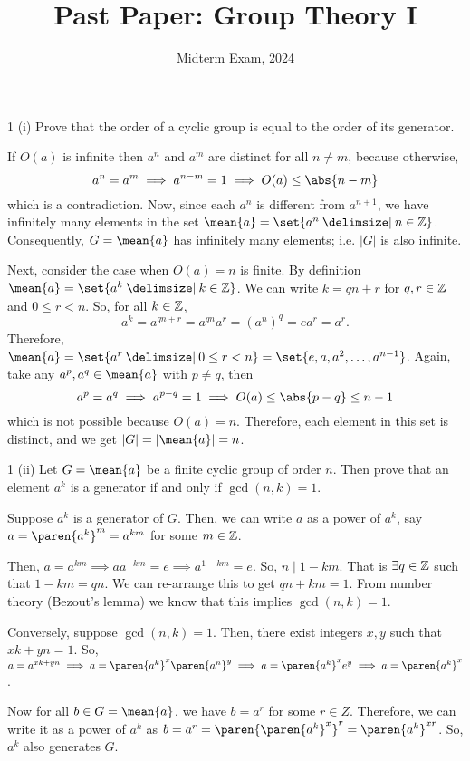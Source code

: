 \documentclass[11pt]{penrose}
\title{Past Paper: Group Theory I}
\subtitle{Midterm Exam, 2024}
\let\cyclic\mean
\begin{document}
\maketitle
\warningtext

\begin{problem}{1 (i)}
    Prove that the order of a cyclic group is equal to the order of its generator.

    \solution If $O(a)$ is infinite then $a^n$ and $a^m$ are distinct for all $n \neq m$, because otherwise,
    \begin{equation*}
        a^n = a^m \implies a^{n - m} = 1 \implies O(a) \leq \abs{n-m}
    \end{equation*}
    which is a contradiction. Now, since each $a^n$ is different from $a^{n+1}$, we have infinitely many elements in the set $\cyclic{a} = \set{a^n \st n \in \Z}$. Consequently, $G = \cyclic{a}$ has infinitely many elements; i.e. $|G|$ is also infinite.

    Next, consider the case when $O(a) = n$ is finite. By definition $\cyclic{a} = \set{a^k \st k \in \Z}$. We can write $k = qn + r$ for $q, r \in \mathbb{Z}$ and $0 \leq r < n$. So, for all $k \in \mathbb{Z}$,
    \begin{equation*}
        a^k = a^{qn+r} = a^{qn} a^r = (a^{n})^{q} = e a^r = a^r.
    \end{equation*}
    Therefore, $\cyclic{a} = \set{a^r \st 0 \leq r < n} = \set{e, a, a^2, \dots, a^{n-1}}$. Again, take any $a^p, a^q \in \cyclic{a}$ with $p \neq q$, then
    \begin{equation*}
        a^p = a^q \implies a^{p - q} = 1 \implies O(a) \leq \abs{p-q} \leq n-1
    \end{equation*}
    which is not possible because $O(a) = n$. Therefore, each element in this set is distinct, and we get $|G| = |\cyclic{a}| = n$.
\end{problem}

\begin{problem}{1 (ii)}
    Let $G = \cyclic{a}$ be a finite cyclic group of order $n$. Then prove that an element $a^k$ is a generator if and only if $\gcd(n, k) = 1$.

    \solution Suppose $a^k$ is a generator of $G$. Then, we can write $a$ as a power of $a^k$, say $a = \paren{a^k}^m = a^{km}$ for some $m \in \mathbb{Z}$.

    Then, $a = a^{km} \implies a a^{-km} = e \implies a^{1-km} = e$. So, $n \mid 1 - km$. That is $\exists q \in \mathbb{Z}$ such that $1 - km = qn$. We can re-arrange this to get $qn + km = 1$. From number theory (Bezout's lemma) we know that this implies $\gcd(n,k)=1$.

    Conversely, suppose $\gcd(n,k)=1$. Then, there exist integers $x, y$ such that $xk + yn = 1$. So, $a = a^{xk + yn} \implies a = \paren{a^{k}}^{x} \paren{a^{n}}^{y} \implies a = \paren{a^{k}}^{x} e^{y} \implies a = \paren{a^{k}}^{x}$.

    Now for all $b \in G=\cyclic{a}$, we have $b = a^r$ for some $r \in Z$. Therefore, we can write it as a power of $a^k$ as $b = a^r = \paren{\paren{a^{k}}^{x}}^{r} = \paren{a^{k}}^{xr}$. So, $a^k$ also generates $G$.
\end{problem}
\end{document}
